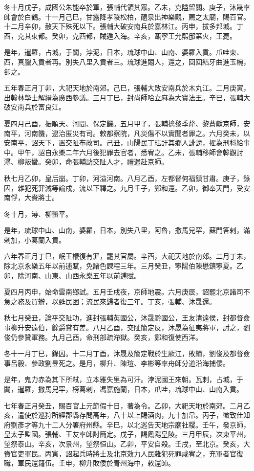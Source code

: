 \begin{pinyinscope}
冬十月戊子，成國公朱能卒於軍，張輔代領其眾。乙未，克隘留關。庚子，沐晟率師會於白鶴。十一月己巳，甘露降孝陵松柏，醴泉出神樂觀，薦之太廟，賜百官。十二月辛卯，赦天下殊死以下。張輔大破安南兵於嘉林江。丙申，拔多邦城。丁酉，克其東都。癸卯，克西都，賊遁入海。辛亥，甌寧王允熙邸第火，王薨。

是年，暹羅，占城，于闐，浡泥，日本，琉球中山、山南、婆羅入貢。爪哇東、西，真臘入貢者再。別失八里入貢者三。琉球進閹人，還之，回回結牙曲進玉椀，卻之。

五年春正月丁卯，大祀天地於南郊。己巳，張輔大敗安南兵於木丸江。二月庚寅，出翰林學士解縉為廣西參議。三月丁巳，封尚師哈立麻為大寶法王。辛巳，張輔大破安南兵於富良江。

夏四月己酉，振順天、河間、保定饑。五月甲子，張輔擒黎季犛、黎蒼獻京師，安南平，河南饑，逮治匿災有司。敕都察院，凡災傷不以實聞者罪之。六月癸未，以安南平，詔天下，置交阯布政司。己丑，山陽民丁珏訐其鄉人誹謗，擢為刑科給事中。甲午，詔自永樂二年六月後犯罪去官者，悉宥之。乙未，張輔移師會韓觀討潯、柳叛蠻。癸卯，命張輔訪交阯人才，禮遣赴京師。

秋七月乙卯，皇后崩。丁卯，河溢河南。八月乙酉，左都督何福鎮甘肅。庚子，錄囚，雜犯死罪減等論戍，流以下釋之。九月壬子，鄭和還。乙卯，御奉天門，受安南俘，大賚將士。

冬十月，潯、柳蠻平。

是年，琉球中山、山南，婆羅，日本，別失八里，阿魯，撒馬兒罕，蘇門答剌，滿剌加，小葛蘭入貢。

六年春正月丁巳，岷王楩復有罪，罷其官屬。辛酉，大祀天地於南郊。二月丁未，除北京永樂五年以前逋賦，免諸色課程三年。三月癸丑，寧陽伯陳懋鎮寧夏。乙卯，除河南、山東、山西永樂五年以前逋賦。

夏四月丙申，始命雲南鄉試。五月壬戌夜，京師地震。六月庚辰，詔罷北京諸司不急之務及買辦，以甦民困；流民來歸者復三年。丁亥，張輔、沐晟還。

秋七月癸丑，論平交阯功，進封張輔英國公，沐晟黔國公，王友清遠侯，封都督僉事柳升安遠伯，餘爵賞有差。八月乙酉，交阯簡定反，沐晟為征夷將軍，討之，劉俊仍參贊軍務。九月己酉，命刑部疏滯獄。癸亥，鄭和復使西洋。

冬十一月丁巳，錄囚。十二月丁酉，沐晟及簡定戰於生厥江，敗績，劉俊及都督僉事呂毅、參政劉昱死之。是月，柳升、陳瑄、李彬等率舟師分道沿海捕倭。

是年，鬼力赤為其下所弒，立本雅失里為可汗。浡泥國王來朝。瓦剌，占城，于闐，暹羅，撒馬兒罕，榜葛剌，馮嘉施蘭，日本，爪哇，琉球中山、山南入貢。

七年春正月癸丑，賜百官上元節假十日，著為令。乙卯，大祀天地於南郊。二月乙亥，遣使於巡狩所經郡縣存問高年，八十以上賜酒肉，九十加帛。丙子，徵致仕知府劉彥才等九十二人分署府州縣。辛巳，以北巡告天地宗廟社稷。壬午，發京師，皇太子監國。張輔、王友率師討簡定。戊子，謁鳳陽皇陵。三月甲辰，次東平州，望祭泰山。辛亥，次景州，望祭恒山。乙卯，平安自殺。壬戌，至北京。癸亥，大賚官吏軍民。丙寅，詔起兵時將士及北京效力人民雜犯死罪咸宥之，充軍者官復職，軍民還籍伍。壬申，柳升敗倭於青州海中，敕還師。


\end{pinyinscope}
